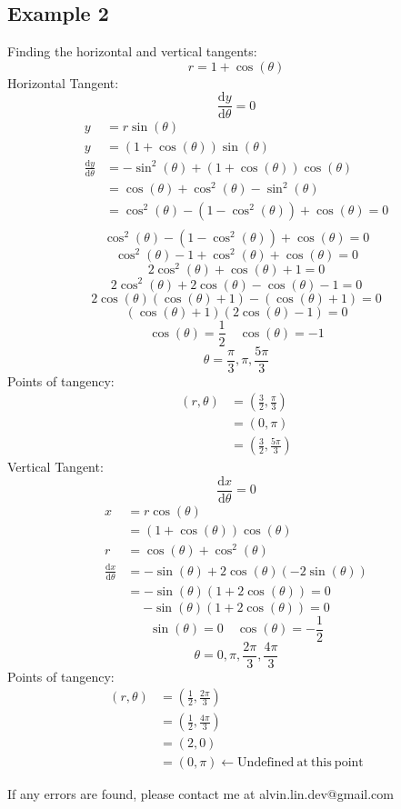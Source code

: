 \documentclass[letterpaper, 12pt]{article}
\newcommand*{\diff}{\mathrm{d}}
\begin{document}
\subsection*{Example 2}
Finding the horizontal and vertical tangents:
\[ r = 1+\cos(\theta) \]
Horizontal Tangent:
\[ \frac{\diff{y}}{\diff{\theta}} = 0 \]
\begin{align*}
  y &= r\sin(\theta) \\
  y &= (1+\cos(\theta))\sin(\theta) \\
  \frac{\diff{y}}{\diff{\theta}} &=
    -\sin^{2}(\theta)+(1+\cos(\theta))\cos(\theta) \\
  &= \cos(\theta)+\cos^{2}(\theta)-\sin^{2}(\theta) \\
  &= \cos^{2}(\theta)-(1-\cos^{2}(\theta))+\cos(\theta) = 0 \\
\end{align*}
\[ \cos^{2}(\theta)-(1-\cos^{2}(\theta))+\cos(\theta) = 0 \]
\[ \cos^{2}(\theta)-1+\cos^{2}(\theta)+\cos(\theta) = 0 \]
\[ 2\cos^{2}(\theta)+\cos(\theta)+1 = 0 \]
\[ 2\cos^{2}(\theta)+2\cos(\theta)-\cos(\theta)-1 = 0 \]
\[ 2\cos(\theta)(\cos(\theta)+1)-(\cos(\theta)+1) = 0 \]
\[ (\cos(\theta)+1)(2\cos(\theta)-1) = 0 \]
\[ \cos(\theta) = \frac{1}{2} \quad \cos(\theta) = -1 \]
\[ \theta = \frac{\pi}{3},\pi,\frac{5\pi}{3} \]
Points of tangency:
\begin{align*}
  (r,\theta) &= (\frac{3}{2},\frac{\pi}{3}) \\
  &= (0,\pi) \\
  &= (\frac{3}{2},\frac{5\pi}{3})
\end{align*}
Vertical Tangent:
\[ \frac{\diff{x}}{\diff{\theta}} = 0 \]
\begin{align*}
  x &= r\cos(\theta) \\
  &= (1+\cos(\theta))\cos(\theta) \\
  r &= \cos(\theta)+\cos^{2}(\theta) \\
  \frac{\diff{x}}{\diff{\theta}} &=
    -\sin(\theta)+2\cos(\theta)(-2\sin(\theta)) \\
  &= -\sin(\theta)(1+2\cos(\theta)) = 0
\end{align*}
\[ -\sin(\theta)(1+2\cos(\theta)) = 0 \]
\[ \sin(\theta) = 0 \quad \cos(\theta) = -\frac{1}{2} \]
\[ \theta = 0,\pi,\frac{2\pi}{3},\frac{4\pi}{3} \]
Points of tangency:
\begin{align*}
  (r,\theta) &= (\frac{1}{2},\frac{2\pi}{3}) \\
  &= (\frac{1}{2},\frac{4\pi}{3}) \\
  &= (2,0) \\
  &= (0,\pi) \leftarrow \mathrm{Undefined\ at\ this\ point}
\end{align*}

\begin{center}
  If any errors are found, please contact me at alvin.lin.dev@gmail.com
\end{center}
\end{document}
